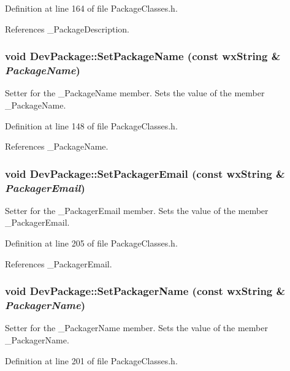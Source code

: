 Definition at line 164 of file Package\-Classes.h.

References \_\-Package\-Description.
\subsubsection{\setlength{\rightskip}{0pt plus 5cm}void Dev\-Package::Set\-Package\-Name (const wx\-String \& {\em Package\-Name})\hspace{0.3cm}{\tt  [inline]}}\label{class_dev_package_63ca69013f86a19406f5070f0b479a7e}


Setter for the \_\-Package\-Name member. Sets the value of the member \_\-Package\-Name. 

Definition at line 148 of file Package\-Classes.h.

References \_\-Package\-Name.
\subsubsection{\setlength{\rightskip}{0pt plus 5cm}void Dev\-Package::Set\-Packager\-Email (const wx\-String \& {\em Packager\-Email})\hspace{0.3cm}{\tt  [inline]}}\label{class_dev_package_0c40c3a30df9a355896f5a2e83514c57}


Setter for the \_\-Packager\-Email member. Sets the value of the member \_\-Packager\-Email. 

Definition at line 205 of file Package\-Classes.h.

References \_\-Packager\-Email.
\subsubsection{\setlength{\rightskip}{0pt plus 5cm}void Dev\-Package::Set\-Packager\-Name (const wx\-String \& {\em Packager\-Name})\hspace{0.3cm}{\tt  [inline]}}\label{class_dev_package_86f9f9b66df09f0401b2e17cf2a3d0b4}


Setter for the \_\-Packager\-Name member. Sets the value of the member \_\-Packager\-Name. 

Definition at line 201 of file Package\-Classes.h.

